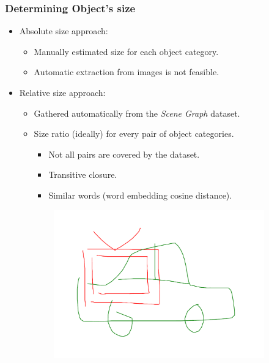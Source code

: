\documentclass{beamer}
\begin{document}
\begin{frame}
    \frametitle{Determining Object's size}
    \begin{itemize}
        \item Absolute size approach:
        \begin{itemize}
            \item Manually estimated size for each object category.
            \item Automatic extraction from images is not feasible.
        \end{itemize}
        \item Relative size approach:
        \begin{itemize}
            \item Gathered automatically from the \emph{Scene Graph} dataset.
            \item Size ratio (ideally) for every pair of object categories.
            \begin{itemize}
                \item Not all pairs are covered by the dataset.
                \item Transitive closure.
                \item Similar words (word embedding cosine distance).
            \end{itemize}
        \end{itemize}
    \end{itemize}
    \begin{figure}[ht]
        \caption*{}
        \centering
        \begin{subfigure}{0.35\textwidth}
            \centering
            \includegraphics[width=\textwidth]{figures/car_on_tv_abs.pdf}

\end{subfigure}
\end{figure}
\end{frame}
\end{document}
